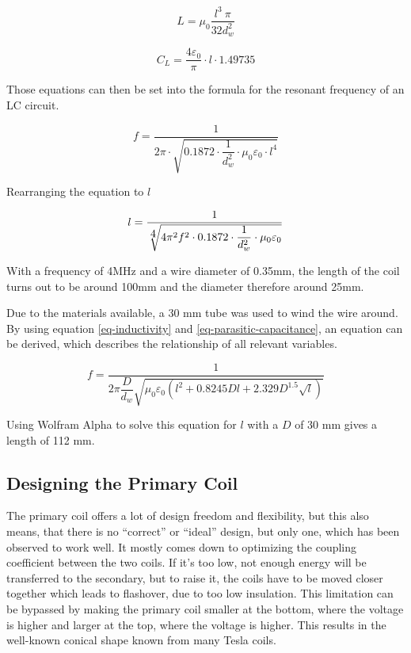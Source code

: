\begin{equation}
    L = \mu_0 \frac{l^3\ \pi}{32 d_w^2}
\end{equation}

\begin{equation}
    C_L = \frac{4\varepsilon_0}{\pi} \cdot l \cdot 1.49735
\end{equation}

Those equations can then be set into the formula for the resonant frequency of an LC circuit.

\begin{equation}
    f = \frac{1}{2\pi \cdot \sqrt{0.1872 \cdot \dfrac{1}{d_w^2} \cdot \mu_0 \varepsilon_0 \cdot l^4}}
\end{equation}

Rearranging the equation to \(l\)

\begin{equation}
    l = \frac{1}{\sqrt[\scalebox{1}{4}]{4\pi^2 f^2 \cdot0.1872 \cdot \dfrac{1}{d_w^2} \cdot \mu_0 \varepsilon_0}}
\end{equation}

With a frequency of 4MHz and a wire diameter of 0.35mm, the length of the coil turns out to be around 100mm and the diameter therefore around 25mm.

Due to the materials available, a 30 mm tube was used to wind the wire around. By using equation \ref{eq-inductivity} and \ref{eq-parasitic-capacitance}, an equation can be derived, which describes the relationship of all relevant variables.

\begin{equation}
    f = \frac{1}{2\pi \dfrac{D}{d_w} \sqrt{\mu_0 \varepsilon_0 \left( l^2 + 0.8245 D l + 2.329 D^{1.5} \sqrt{l} \right)}}
\end{equation}

Using Wolfram Alpha to solve this equation for \(l\) with a \(D\) of 30 mm gives a length of 112 mm.

\subsection{Designing the Primary Coil}
\label{sec:designing-the-primary}

The primary coil offers a lot of design freedom and flexibility, but this also means, that there is no \enquote{correct} or \enquote{ideal} design, but only one, which has been observed to work well. It mostly comes down to optimizing the coupling coefficient between the two coils. If it's too low, not enough energy will be transferred to the secondary, but to raise it, the coils have to be moved closer together which leads to flashover, due to too low insulation. %
This limitation can be bypassed by making the primary coil smaller at the bottom, where the voltage is higher and larger at the top, where the voltage is higher. This results in the well-known conical shape known from many Tesla coils.

